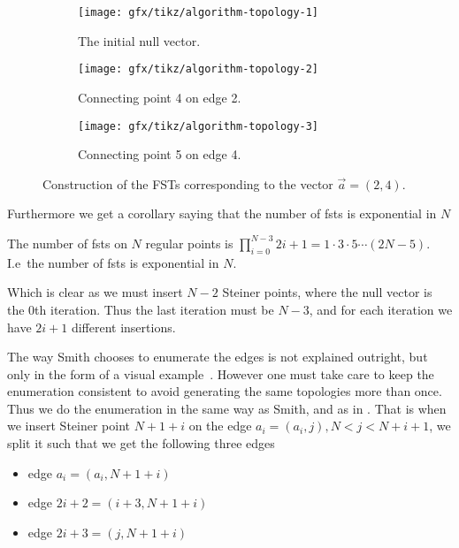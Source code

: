 \begin{figure}[htbp]
\centering
  \begin{subfigure}[t]{0.3\textwidth}
    \texttt{[image: gfx/tikz/algorithm-topology-1]}
    \caption{The initial null vector.\label{fig:algorithm-topology-1}}
  \end{subfigure}
  \hfill
  \begin{subfigure}[t]{0.3\textwidth}
    \texttt{[image: gfx/tikz/algorithm-topology-2]}
    \caption{Connecting point 4 on edge 2.\label{fig:algorithm-topology-2}}
  \end{subfigure}
  \hfill
  \begin{subfigure}[t]{0.3\textwidth}
    \texttt{[image: gfx/tikz/algorithm-topology-3]}
    \caption{Connecting point 5 on edge 4.\label{fig:algorithm-topology-3}}
  \end{subfigure}
  \caption[Construction of \glspl{fst}]{Construction of the FSTs corresponding
    to the vector $\vec{a} = (2, 4)$.\label{fig:algorithm-topologies}}
\end{figure}

Furthermore we get a corollary saying that the number of \glspl{fst} is
exponential in $N$

\begin{corollary}
\label{cor:number-of-fsts}
The number of \glspl{fst} on $N$ regular points is
$\prod_{i=0}^{N-3} 2i+1 = 1 \cdot 3 \cdot 5 \cdots (2N -
5)$. I.e\ the number of \glspl{fst} is exponential in $N$.
\end{corollary}

Which is clear as we must insert $N-2$ Steiner points, where the null vector is
the $0$th iteration. Thus the last iteration must be $N-3$, and for each
iteration we have $2i+1$ different insertions.

The way Smith chooses to enumerate the edges is not explained outright, but only
in the form of a visual example~\cite{Smith1992}. However one must take care to
keep the enumeration consistent to avoid generating the same topologies more
than once. Thus we do the enumeration in the same way as Smith, and as in
. That is when we insert Steiner point $N+1+i$ on
the edge $a_{i} = (a_{i}, j), N < j < N+i+1$, we split it such that we get the
following three edges
\begin{itemize}
\item edge $a_{i} = (a_{i},N+1+i)$
\item edge $ 2i + 2 = (i+3,N+1+i)$
\item edge $ 2i + 3 = (j,N+1+i)$
\end{itemize}

